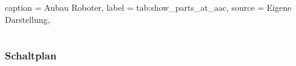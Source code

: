 \begin{dhbwtable}{%
    caption	= Aubau Roboter,
    label	= tab:show_parts_at_aac,
    source	= Eigene Darstellung,
}
\begin{tabular}{llll}
        
        \bottomrule
    \end{tabular}    
\end{dhbwtable}



\subsubsection{Schaltplan}


